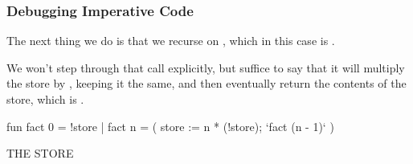 \documentclass[aspectratio=169, handout]{beamer}
\begin{document}
\begin{frame}[fragile]
  \frametitle{Debugging Imperative Code}

  \begin{minipage}[t][0.6in][t]{\textwidth}
    The next thing we do is that we recurse on , which in this case
    is .

    \vspace{\fill}

    We won't step through that call explicitly, but suffice to say that it will
    multiply the store by , keeping it the same, and then eventually return
    the contents of the store, which is .
  \end{minipage}

  \vspace{10pt}

  \begin{center}
    \begin{minipage}[t][1.7in][t]{0.6\textwidth}
      \vspace{\fill}
      \begin{codeblock}
        fun fact 0 = !store
          | fact n =
              ( store := n * (!store);
                `fact (n - 1)`
              )
      \end{codeblock}
      \vspace{\fill}
    \end{minipage}
    \hfill\vline\hfill
    \begin{minipage}[t][1.7in][t]{0.3\textwidth}
      \centering
      {\hspace{-20pt}\color{gray} \large THE STORE}

      \vspace{\fill}
      \vspace{\fill}
    \end{minipage}
  \end{center}
\end{frame}
\end{document}
